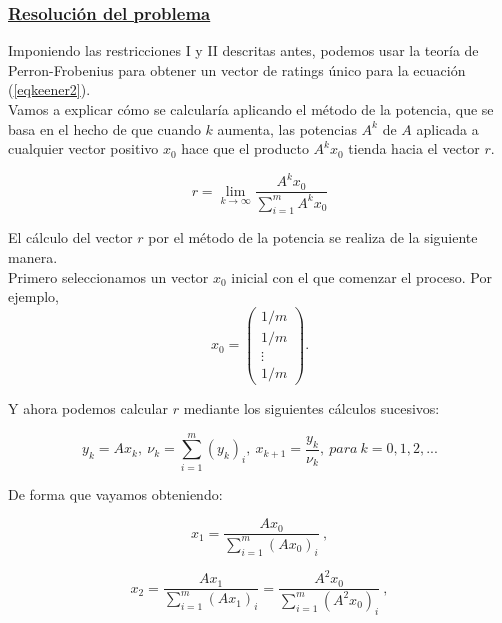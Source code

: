 \subsubsection*{\underline{Resolución del problema}}
Imponiendo las restricciones I y II descritas antes, podemos usar la teoría de Perron-Frobenius \cite[pág 36]{libro_rankings} \cite[Chapter 8]{perron} para obtener un vector de ratings único para la ecuación (\ref{eqkeener2}).\\

Vamos a explicar cómo se calcularía aplicando el método de la potencia, que se basa en el hecho de que cuando $k$ aumenta, las potencias $A^{k}$ de $A$ aplicada a cualquier vector positivo $x_{0}$ hace que el producto $A^{k} x_{0}$ tienda hacia el vector $r$.

\begin{equation}
r = \lim\limits_{k \rightarrow \infty}\dfrac{A^{k} x_{0}}{\sum_{i=1}^{m}A^{k} x_{0}} 
\end{equation}
 
El cálculo del vector $r$ por el método de la potencia se realiza de la siguiente manera.\\
Primero seleccionamos un vector $x_{0}$ inicial con el que comenzar el proceso. Por ejemplo,\\
\begin{equation*}
x_{0} = 
\left( \begin{array}{c}
1/m\\
1/m\\
\vdots\\
1/m
\end{array}\right).
\end{equation*}
 
Y ahora podemos calcular $r$ mediante los siguientes cálculos sucesivos:

\begin{equation}
y_{k}=Ax_{k}, \ \nu_{k}=\sum_{i=1}^{m}(y_{k})_{i}, \ x_{k+1}=\dfrac{y_{k}}{\nu_{k}}, \ para \ k = 0,1,2,... \label{powerm}
\end{equation}
 
De forma que vayamos obteniendo:

\begin{equation*}
x_{1}=\dfrac{Ax_{0}}{\sum_{i=1}^{m}(Ax_{0})_{i}} \ ,
\end{equation*}

\begin{equation*}
x_{2}=\dfrac{Ax_{1}}{\sum_{i=1}^{m}(Ax_{1})_{i}} = \dfrac{A^{2}x_{0}}{\sum_{i=1}^{m}(A^{2}x_{0})_{i}} \ ,
\end{equation*}

